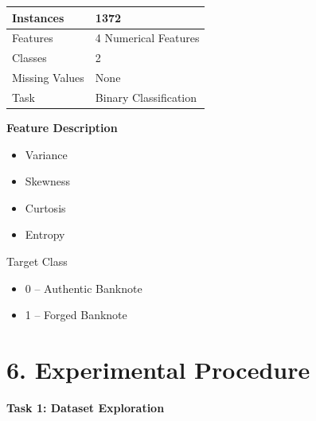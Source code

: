 \documentclass[11pt]{article}
\begin{document}
\begin{center}
\begin{tabular}{|l|l|}
\hline
Instances & 1372\\
\hline
Features & 4 Numerical Features\\
\hline
Classes & 2\\
\hline
Missing Values & None\\
\hline
Task & Binary Classification\\
\hline
\end{tabular}
\end{center}

\textbf{Feature Description}

\begin{itemize}
\item Variance
\item Skewness
\item Curtosis
\item Entropy
\end{itemize}

Target Class

\begin{itemize}
\item 0 -- Authentic Banknote
\item 1 -- Forged Banknote
\end{itemize}


\section*{6. Experimental Procedure}

\textbf{Task 1: Dataset Exploration}
\end{document}
